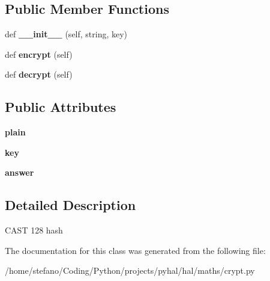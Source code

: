 \subsection*{Public Member Functions}
\begin{DoxyCompactItemize}
\item 
def {\bfseries \+\_\+\+\_\+init\+\_\+\+\_\+} (self, string, key)\hypertarget{classhal_1_1maths_1_1crypt_1_1_c_a_s_t128_a285a3b0d8e5ab5a6aa1bfe2ed07cf275}{}\label{classhal_1_1maths_1_1crypt_1_1_c_a_s_t128_a285a3b0d8e5ab5a6aa1bfe2ed07cf275}

\item 
def {\bfseries encrypt} (self)\hypertarget{classhal_1_1maths_1_1crypt_1_1_c_a_s_t128_a955fa0eab07e305ba028b007c2851abf}{}\label{classhal_1_1maths_1_1crypt_1_1_c_a_s_t128_a955fa0eab07e305ba028b007c2851abf}

\item 
def {\bfseries decrypt} (self)\hypertarget{classhal_1_1maths_1_1crypt_1_1_c_a_s_t128_a70b29321e653c2daaeb2c9e144d2c1c0}{}\label{classhal_1_1maths_1_1crypt_1_1_c_a_s_t128_a70b29321e653c2daaeb2c9e144d2c1c0}

\end{DoxyCompactItemize}
\subsection*{Public Attributes}
\begin{DoxyCompactItemize}
\item 
{\bfseries plain}\hypertarget{classhal_1_1maths_1_1crypt_1_1_c_a_s_t128_af91078dab517ef6705a17f5c41821d27}{}\label{classhal_1_1maths_1_1crypt_1_1_c_a_s_t128_af91078dab517ef6705a17f5c41821d27}

\item 
{\bfseries key}\hypertarget{classhal_1_1maths_1_1crypt_1_1_c_a_s_t128_af89de906c01f3aa02c872831548307a6}{}\label{classhal_1_1maths_1_1crypt_1_1_c_a_s_t128_af89de906c01f3aa02c872831548307a6}

\item 
{\bfseries answer}\hypertarget{classhal_1_1maths_1_1crypt_1_1_c_a_s_t128_a452da0fec6f88f16ec468ceaa55b3d18}{}\label{classhal_1_1maths_1_1crypt_1_1_c_a_s_t128_a452da0fec6f88f16ec468ceaa55b3d18}

\end{DoxyCompactItemize}


\subsection{Detailed Description}
\begin{DoxyVerb}CAST 128 hash \end{DoxyVerb}
 

The documentation for this class was generated from the following file\+:\begin{DoxyCompactItemize}
\item 
/home/stefano/\+Coding/\+Python/projects/pyhal/hal/maths/crypt.\+py\end{DoxyCompactItemize}
